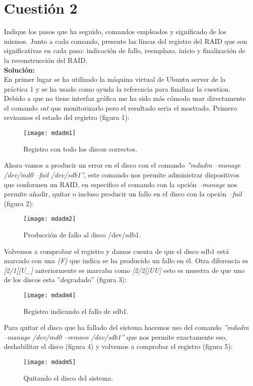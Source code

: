 \documentclass[a4paper, 10pt]{article} %
\begin{document}
\section{Cuestión 2}
Indique los pasos que ha seguido, comandos empleados y significado de los mismos. Junto a cada comando, presente las líneas del registro del RAID que son significativas en cada paso: indicación de fallo, reemplazo, inicio y finalización de la reconstrucción del RAID.\\
\textbf{Solución:}\\
\cite{7} En primer lugar se ha utilizado la máquina virtual de Ubuntu server de la práctica 1 y se ha usado como ayuda la referencia \cite{8} para finalizar la cuestion. Debido a que no tiene interfaz gráfica me ha sido más cómodo usar directamente el comando \textit{cat} que monitorizarlo pero el resultado seria el mostrado. Primero revisamos el estado del registro (figura 1):
\begin{figure}[H]
\centering 
\texttt{[image: mdadm1]} 
\caption{Registro con todo los discos correctos.} 
\label{contexto:figura} 
\end{figure}
Ahora vamos a producir un error en el disco con el comando \textit{''mdadm --manage /dev/md0 --fail /dev/sdb1''}, este comando nos permite administrar dispositivos que conformen un RAID, en especifico el comando con la opción \textit{--manage} nos permite añadir, quitar o incluso producir un fallo en el disco con la opción \textit{--fail} (figura 2):
\begin{figure}[H]
\centering 
\texttt{[image: mdadm2]} 
\caption{Producción de fallo al disco /dev/sdb1.} 
\label{contexto:figura} 
\end{figure}
Volvemos a comprobar el registro y damos cuenta de que el disco sdb1 está marcado con una \textit{(F)} que indica se ha producido un fallo en él. Otra diferencia es \textit{[2/1][U\_]} anteriormente se marcaba como \textit{[2/2][UU]} esto es muestra de que uno de los discos esta ''degradado'' (figura 3):
\begin{figure}[H]
\centering 
\texttt{[image: mdadm4]} 
\caption{Registro indicando el fallo de sdb1.} 
\label{contexto:figura} 
\end{figure}
Para quitar el disco que ha fallado del sistema hacemos uso del comando \textit{''mdadm --manage /dev/md0 --remove /dev/sdb1''} que nos permite exactamente eso, deshabilitar el disco (figura 4) y volvemos a comprobar el registro (figura 5):
\begin{figure}[H]
\centering 
\texttt{[image: mdadm5]} 
\caption{Quitando el disco del sistema.} 
\label{contexto:figura} 
\end{figure}
\end{document}
